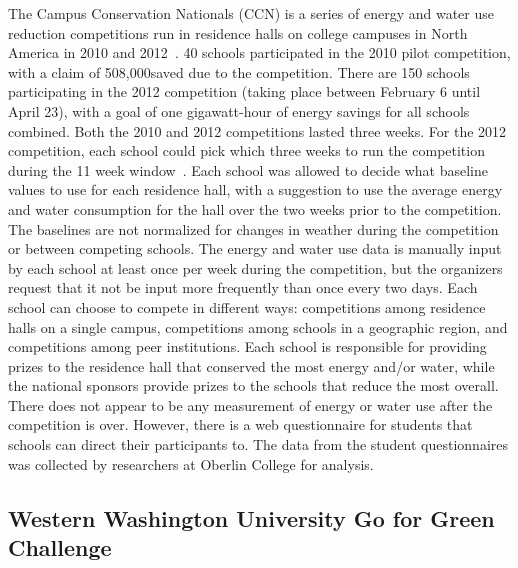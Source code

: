 The Campus Conservation Nationals (CCN) is a series of energy and water use reduction competitions run in residence halls on college campuses in North America in 2010 and 2012~\cite{conservation-nationals-2012}. 40 schools participated in the 2010 pilot competition, with a claim of 508,000\kWh saved due to the competition. There are 150 schools participating in the 2012 competition (taking place between February 6 until April 23), with a goal of one gigawatt-hour of energy savings for all schools combined. Both the 2010 and 2012 competitions lasted three weeks. For the 2012 competition, each school could pick which three weeks to run the competition during the 11 week window~\cite{conservation-nationals-website}. Each school was allowed to decide what baseline values to use for each residence hall, with a suggestion to use the average energy and water consumption for the hall over the two weeks prior to the competition. The baselines are not normalized for changes in weather during the competition or between competing schools. The energy and water use data is manually input by each school at least once per week during the competition, but the organizers request that it not be input more frequently than once every two days. Each school can choose to compete in different ways: competitions among residence halls on a single campus, competitions among schools in a geographic region, and competitions among peer institutions. Each school is responsible for providing prizes to the residence hall that conserved the most energy and/or water, while the national sponsors provide prizes to the schools that reduce the most overall. There does not appear to be any measurement of energy or water use after the competition is over. However, there is a web questionnaire for students that schools can direct their participants to. The data from the student questionnaires was collected by researchers at Oberlin College for analysis.

\subsection{Western Washington University Go for Green Challenge}

